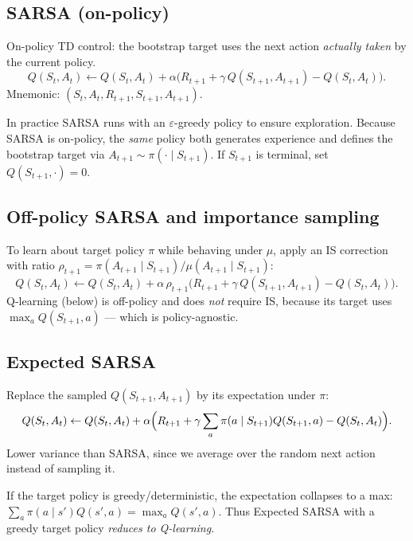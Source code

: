 \documentclass[11pt, oneside]{book}
\begin{document}
\subsection{SARSA (on-policy)}

\begin{thmbox}[title={SARSA}]
On-policy TD control: the bootstrap target uses the next action
\emph{actually taken} by the current policy.
\[
  Q(S_t,A_t) \leftarrow Q(S_t,A_t)
    + \alpha\bigl(R_{t+1} + \gamma\,Q(S_{t+1},A_{t+1}) - Q(S_t,A_t)\bigr).
\]
Mnemonic: $(S_t, A_t, R_{t+1}, S_{t+1}, A_{t+1})$.
\end{thmbox}

In practice SARSA runs with an $\varepsilon$-greedy policy to ensure
exploration. Because SARSA is on-policy, the \emph{same} policy both
generates experience and defines the bootstrap target via
$A_{t+1} \sim \pi(\cdot\mid S_{t+1})$.
If $S_{t+1}$ is terminal, set $Q(S_{t+1},\cdot) = 0$.

\subsection{Off-policy SARSA and importance sampling}

\begin{notebox}[title={Off-Policy SARSA}]
To learn about target policy $\pi$ while behaving under $\mu$, apply an IS
correction with ratio $\rho_{t+1} = \pi(A_{t+1}\mid S_{t+1})/\mu(A_{t+1}\mid S_{t+1})$:
\[
  Q(S_t,A_t) \leftarrow Q(S_t,A_t)
    + \alpha\,\rho_{t+1}\bigl(R_{t+1} + \gamma\,Q(S_{t+1},A_{t+1}) - Q(S_t,A_t)\bigr).
\]
Q-learning (below) is off-policy and does \emph{not} require IS, because
its target uses $\max_a Q(S_{t+1},a)$ --- which is policy-agnostic.
\end{notebox}

\subsection{Expected SARSA}

\begin{thmbox}[title={Expected SARSA}]
Replace the sampled $Q(S_{t+1},A_{t+1})$ by its expectation under $\pi$:
\[
  Q(S_t,A_t) \leftarrow Q(S_t,A_t)
    + \alpha\Bigl(R_{t+1} + \gamma\sum_{a}\pi(a\mid S_{t+1})Q(S_{t+1},a)
      - Q(S_t,A_t)\Bigr).
\]
Lower variance than SARSA, since we average over the random next action
instead of sampling it.
\end{thmbox}

\begin{notebox}[title={Expected SARSA vs.\ Q-Learning}]
If the target policy is greedy/deterministic, the expectation collapses to a
max: $\sum_a \pi(a\mid s')Q(s',a) = \max_a Q(s',a)$.
Thus Expected SARSA with a greedy target policy \emph{reduces to Q-learning}.
\end{notebox}
\end{document}
